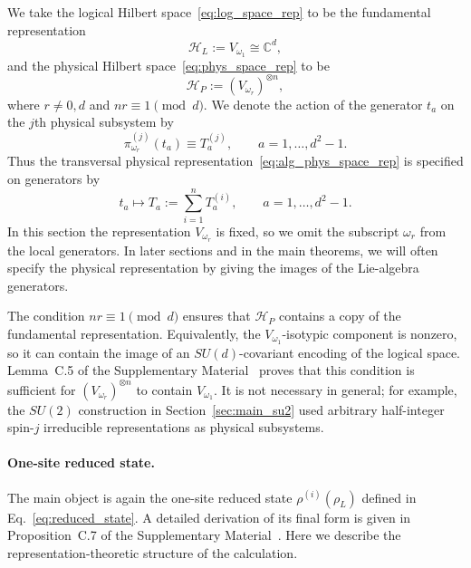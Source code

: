 \documentclass[10pt,twocolumn,superscriptaddress,aps,amsmath,amssymb,citeautoscript,floatfix,prx]{revtex4-2}
\newcounter{alg}
\theoremstyle{plain}
\theoremstyle{plain}
\theoremstyle{plain}
\theoremstyle{plain}
\theoremstyle{plain}
\theoremstyle{plain}
\begin{document}
We take the logical Hilbert space~\eqref{eq:log_space_rep} to be the fundamental representation
$$
\mathcal H_L:=V_{\omega_1}\cong \mathbb C^d ,
$$
and the physical Hilbert space~\eqref{eq:phys_space_rep} to be
$$
\mathcal H_P:=(V_{\omega_r})^{\otimes n},
$$
where $r\neq 0,d$ and $nr\equiv 1\pmod d$. We denote the action of the generator $t_a$ on the $j$th physical subsystem by
$$
\pi_{\omega_r}^{(j)}(t_a)\equiv T_a^{(j)},
\qquad
a=1,\ldots,d^2-1 .
$$
Thus the transversal physical representation~\eqref{eq:alg_phys_space_rep} is specified on generators by
$$
t_a
\longmapsto
T_a
:=
\sum_{i=1}^n T_a^{(i)},
\qquad
a=1,\ldots,d^2-1 .
$$
In this section the representation $V_{\omega_r}$ is fixed, so we omit the subscript $\omega_r$ from the local generators. In later sections and in the main theorems, we will often specify the physical representation by giving the images of the Lie-algebra generators.

The condition $nr\equiv 1\pmod d$ ensures that $\mathcal H_P$ contains a copy of the fundamental representation. Equivalently, the $V_{\omega_1}$-isotypic component is nonzero, so it can contain the image of an $SU(d)$-covariant encoding of the logical space. Lemma~C.5 of the Supplementary Material~\cite{SuppMat} proves that this condition is sufficient for $(V_{\omega_r})^{\otimes n}$ to contain $V_{\omega_1}$. It is not necessary in general; for example, the $SU(2)$ construction in Section~\ref{sec:main_su2} used arbitrary half-integer spin-$j$ irreducible representations as physical subsystems.

\paragraph{One-site reduced state.}

The main object is again the one-site reduced state $\rho^{(i)}(\rho_L)$ defined in Eq.~\eqref{eq:reduced_state}. A detailed derivation of its final form is given in Proposition~C.7 of the Supplementary Material~\cite{SuppMat}. Here we describe the representation-theoretic structure of the calculation.
\end{document}
